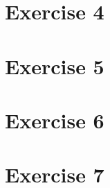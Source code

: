 \documentclass[a4paper]{article}
\begin{document}
\section*{Exercise 4}

\section*{Exercise 5}

\section*{Exercise 6}

\section*{Exercise 7}

\end{document}
